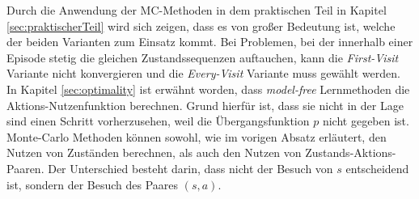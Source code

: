 \par 
 Durch die Anwendung der MC-Methoden in dem praktischen Teil in Kapitel \ref{sec:praktischerTeil} wird sich zeigen, dass es von großer Bedeutung ist, welche der beiden Varianten zum Einsatz kommt. Bei Problemen, bei der innerhalb einer Episode stetig die gleichen Zustandssequenzen auftauchen, kann die \textit{First-Visit} Variante nicht konvergieren und die \textit{Every-Visit} Variante muss gewählt werden.
\newpage 
In Kapitel \ref{sec:optimality} ist erwähnt worden, dass \textit{model-free} Lernmethoden die Aktions-Nutzenfunktion berechnen. Grund hierfür ist, dass sie nicht in der Lage sind einen Schritt vorherzusehen, weil die Übergangsfunktion $p$ nicht gegeben ist. Monte-Carlo Methoden können sowohl, wie im vorigen Absatz erläutert, den Nutzen von Zuständen berechnen, als auch den Nutzen von Zustands-Aktions-Paaren. Der Unterschied besteht darin, dass nicht der Besuch von $s$ entscheidend ist, sondern der Besuch des Paares $(s,a)$.

